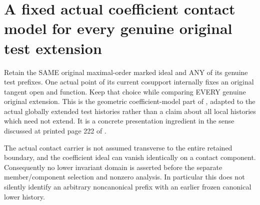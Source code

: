 \section{A fixed actual coefficient contact model for every genuine original test extension}

Retain the SAME original maximal-order marked ideal and ANY of its genuine
test prefixes. One actual point of its current cosupport internally fixes
an original tangent open and function. Keep that choice while comparing
EVERY genuine original extension. This is the geometric coefficient-model
part of \cite[Step I, Cases A and B]{bierstone-milman08-functoriality},
adapted to the actual globally extended test histories rather than a
claim about all local histories which need not extend. It is a concrete
presentation ingredient in the sense discussed at printed page 222 of
\cite{bierstone-milman97-invent-math}.

The actual contact carrier is not assumed transverse to the entire retained
boundary, and the coefficient ideal can vanish identically on a contact
component. Consequently no lower invariant domain is asserted before the
separate member/component selection and nonzero analysis. In particular
this does not silently identify an arbitrary noncanonical prefix with an
earlier frozen canonical lower history.

